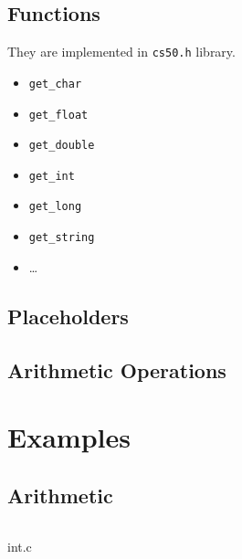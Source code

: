 \subsection{Functions}
They are implemented in \texttt{cs50.h} library.
\begin{itemize}
	\item \texttt{get_char}
	\item \texttt{get_float}
	\item \texttt{get_double}
	\item \texttt{get_int}
	\item \texttt{get_long}
	\item \texttt{get_string}
	\item \dots
\end{itemize}

\subsection{Placeholders}
\begin{itemize}
	\item \texttt{%
	\item \texttt{%
	\item \texttt{%
	\item \texttt{%
	\item \texttt{%
\end{itemize}

\subsection{Arithmetic Operations}
\begin{itemize}
	\item \texttt{+}
	\item \texttt{-}
	\item \texttt{*}
	\item \texttt{/}
	\item \texttt{%
\end{itemize}


\section{Examples}
\subsection{Arithmetic}
\begin{listing}[ht!]
	\inputminted[linenos]{c}{codes/int.c}
	\caption{int.c}
\end{listing}


